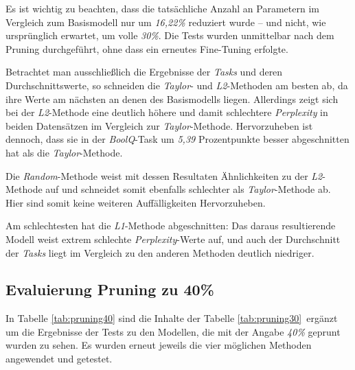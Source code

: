 Es ist wichtig zu beachten, dass die tatsächliche Anzahl an Parametern im
Vergleich zum Basismodell nur um \emph{16,22\%} reduziert wurde – und nicht, wie
ursprünglich erwartet, um volle \emph{30\%}. Die Tests wurden unmittelbar nach
dem Pruning durchgeführt, ohne dass ein erneutes Fine-Tuning erfolgte.

Betrachtet man ausschließlich die Ergebnisse der \emph{Tasks} und deren
Durchschnittswerte, so schneiden die \emph{Taylor}- und \emph{L2}-Methoden am
besten ab, da ihre Werte am nächsten an denen des Basismodells liegen.
Allerdings zeigt sich bei der \emph{L2}-Methode eine deutlich höhere und damit
schlechtere \emph{Perplexity} in beiden Datensätzen im Vergleich zur
\emph{Taylor}-Methode. Hervorzuheben ist dennoch, dass sie in der
\emph{BoolQ}-Task um \emph{5,39} Prozentpunkte besser abgeschnitten hat als die
\emph{Taylor}-Methode.

Die \emph{Random}-Methode weist mit dessen Resultaten Ähnlichkeiten zu der
\emph{L2}-Methode auf und schneidet somit ebenfalls schlechter als
\emph{Taylor}-Methode ab. Hier sind somit keine weiteren Auffälligkeiten
Hervorzuheben.

Am schlechtesten hat die \emph{L1}-Methode abgeschnitten: Das daraus
resultierende Modell weist extrem schlechte \emph{Perplexity}-Werte auf, und
auch der Durchschnitt der \emph{Tasks} liegt im Vergleich zu den anderen
Methoden deutlich niedriger.

\newpage

\subsection{Evaluierung Pruning zu 40\%}

In Tabelle \ref{tab:pruning40} sind die Inhalte der Tabelle
\ref{tab:pruning30} ergänzt um die Ergebnisse der Tests zu den Modellen, die mit
der Angabe \emph{40\%} geprunt wurden zu sehen. Es wurden erneut jeweils die
vier möglichen Methoden angewendet und getestet.

